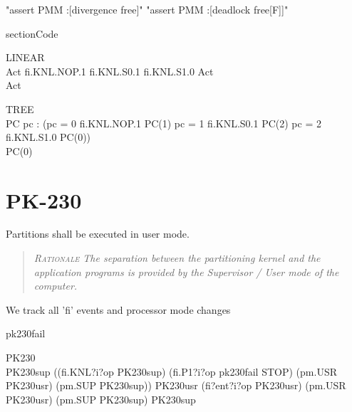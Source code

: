 \begin{assert}
"assert PMM :[divergence free]"
\also "assert PMM :[deadlock free[F]]"
\end{assert}

section{Code}

\begin{circus}
\circprocess LINEAR \circdef \circbegin\\
  Act \circdef fi.KNL.NOP.1 \then
   fi.KNL.S0.1  \then
   fi.KNL.S1.0  \then Act\\
 \circspot Act\\
 \circend
\end{circus}
\begin{circus}
\circprocess TREE \circdef \circbegin\\
  PC \circdef pc : \nat \circspot
    (\lcircguard pc = 0 \rcircguard \circguard fi.KNL.NOP.1 \then PC(1)
     \extchoice
     \lcircguard pc = 1 \rcircguard \circguard fi.KNL.S0.1  \then PC(2)
     \extchoice
     \lcircguard pc = 2 \rcircguard \circguard fi.KNL.S1.0  \then PC(0))\\
  \circspot PC(0)\\
\circend

\end{circus}

\section{PK-230}

Partitions shall be executed in user mode.
\begin{quote}\it
\textsc{Rationale}
The separation between the partitioning kernel and the application programs
is provided by the Supervisor / User mode of the computer.
\end{quote}

We track all 'fi' events and processor mode changes

\begin{circus}
\circchannel pk230fail
\end{circus}

\begin{circus}
\circprocess PK230 \circdef \circbegin\\ %
PK230sup
 \circdef  ((fi.KNL?i?op \then PK230sup)
    \extchoice
    (fi.P1?i?op \then pk230fail \then STOP)
    \extchoice
    (pm.USR \then PK230usr)
    \extchoice
    (pm.SUP \then PK230sup))
PK230usr
 \circdef  (fi?ent?i?op \then PK230usr)
    \extchoice
    (pm.USR \then PK230usr)
    \extchoice
    (pm.SUP \then PK230sup)
  \circspot PK230sup\\
\circend
\end{circus}


